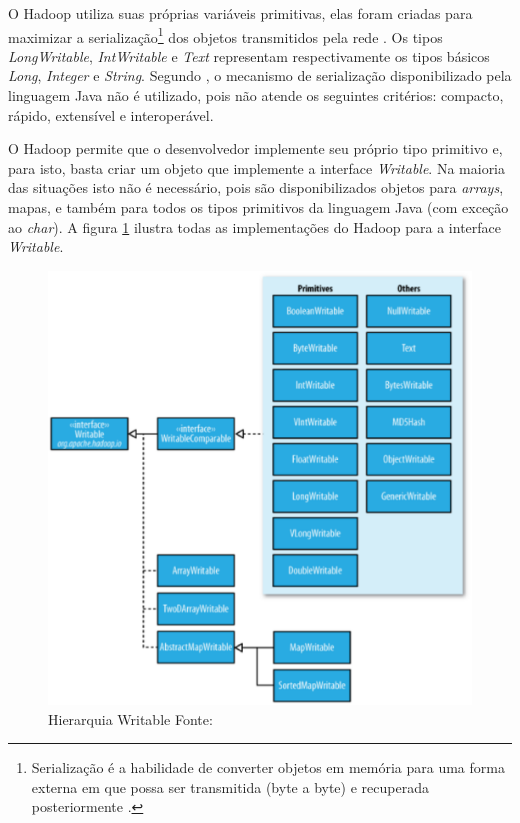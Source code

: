 O Hadoop utiliza suas próprias variáveis primitivas, elas foram criadas para maximizar a serialização\footnote{Serialização é a habilidade de converter objetos em memória para uma forma externa em que possa ser transmitida (byte a byte) e recuperada posteriormente \cite{darwin2014}.} dos objetos transmitidos pela rede \cite{white2012}. Os tipos \textit{LongWritable}, \textit{IntWritable} e \textit{Text} representam respectivamente os tipos básicos \textit{Long}, \textit{Integer} e \textit{String}. Segundo , o mecanismo de serialização disponibilizado pela linguagem Java não é utilizado, pois não atende os seguintes critérios: compacto, rápido, extensível e interoperável.

O Hadoop permite que o desenvolvedor implemente seu próprio tipo primitivo e, para isto, basta criar um objeto que implemente a interface \textit{Writable}. Na maioria das situações isto não é necessário, pois são disponibilizados objetos para \textit{arrays}, mapas, e também para todos os tipos primitivos da linguagem Java (com exceção ao \textit{char}). A figura \ref{fig-writable} ilustra todas as implementações do Hadoop para a interface \textit{Writable}.

\begin{figure}[ht!]
	\centering
	\includegraphics[keepaspectratio=true,scale=0.5]
	  {figuras/hadoop-writable.eps}
	\caption[Hierarquia Writable]{Hierarquia Writable
	\protect\linebreak Fonte: \cite{white2012}}
	\label{fig-writable}
\end{figure}
\FloatBarrier

